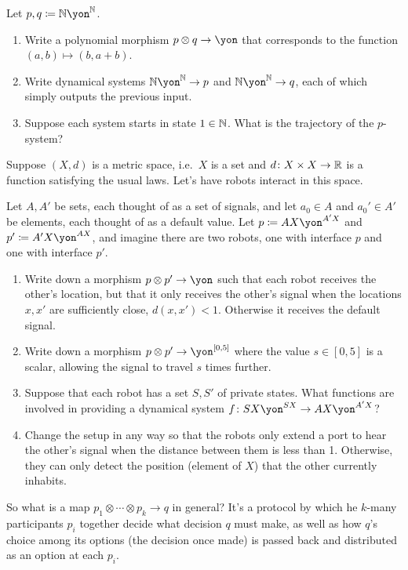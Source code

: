 \documentclass[Book-Poly]{subfiles}
\begin{document}
\begin{exercise}
Let $p,q\coloneqq\nn\yon^\nn$.
\begin{enumerate}
	\item Write a polynomial morphism $p\otimes q\to\yon$ that corresponds to the function $(a,b)\mapsto (b,a+b)$.
	\item Write dynamical systems $\nn\yon^\nn\to p$ and $\nn\yon^\nn\to q$, each of which simply outputs the previous input.
	\item Suppose each system starts in state $1\in\mathbb{N}$. What is the trajectory of the $p$-system?
\qedhere
\end{enumerate}
\end{exercise}

\begin{exercise}
Suppose $(X,d)$ is a metric space, i.e.\ $X$ is a set and $d\colon X\times X\to\mathbb{R}$ is a function satisfying the usual laws. Let's have robots interact in this space.

Let $A,A'$ be sets, each thought of as a set of signals, and let $a_0\in A$ and $a_0'\in A'$ be elements, each thought of as a default value. Let $p\coloneqq AX\yon^{A'X}$ and $p'\coloneqq A'X\yon^{AX}$, and imagine there are two robots, one with interface $p$ and one with interface $p'$.
\begin{enumerate}
	\item Write down a morphism $p\otimes p'\to\yon$ such that each robot receives the other's location, but that it only receives the other's signal when the locations $x,x'$ are sufficiently close, $d(x,x')<1$. Otherwise it receives the default signal.
	\item Write down a morphism $p\otimes p'\to\yon^{[0,5]}$ where the value $s\in [0,5]$ is a scalar, allowing the signal to travel $s$ times further.
	\item Suppose that each robot has a set $S,S'$ of private states. What functions are involved in providing a dynamical system $f\colon SX\yon^{SX}\to AX\yon^{A'X}$?
	\item Change the setup in any way so that the robots only extend a port to hear the other's signal when the distance between them is less than 1. Otherwise, they can only detect the position (element of $X$) that the other currently inhabits.
\qedhere
\end{enumerate}
\end{exercise}

So what is a map $p_1\otimes\cdots\otimes p_k\to q$ in general? It's a protocol by which he $k$-many participants $p_i$ together decide what decision $q$ must make, as well as how $q$'s choice among its options (the decision once made) is passed back and distributed as an option at each $p_i$.
\end{document}
